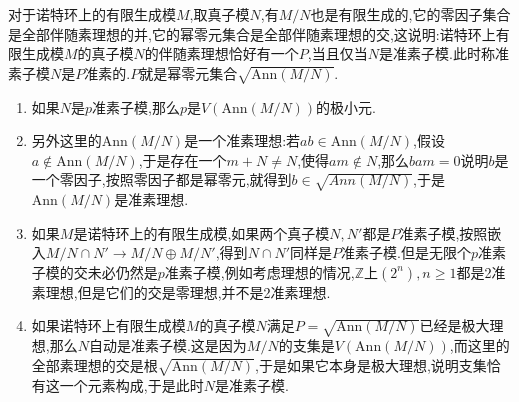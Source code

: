 对于诺特环上的有限生成模$M$,取真子模$N$,有$M/N$也是有限生成的,它的零因子集合是全部伴随素理想的并,它的幂零元集合是全部伴随素理想的交,这说明:诺特环上有限生成模$M$的真子模$N$的伴随素理想恰好有一个$P$,当且仅当$N$是准素子模.此时称准素子模$N$是$P$准素的.$P$就是幂零元集合$\sqrt{\mathrm{Ann}(M/N)}$.
\begin{enumerate}
	\item 如果$N$是$p$准素子模,那么$p$是$V(\mathrm{Ann}(M/N))$的极小元.
	\item 另外这里的$\mathrm{Ann}(M/N)$是一个准素理想:若$ab\in\mathrm{Ann}(M/N)$,假设$a\not\in\mathrm{Ann}(M/N)$,于是存在一个$m+N\not=N$,使得$am\not\in N$,那么$bam=0$说明$b$是一个零因子,按照零因子都是幂零元,就得到$b\in\sqrt{Ann(M/N)}$,于是$\mathrm{Ann}(M/N)$是准素理想.
	\item 如果$M$是诺特环上的有限生成模,如果两个真子模$N,N'$都是$P$准素子模,按照嵌入$M/N\cap N'\to M/N\oplus M/N'$,得到$N\cap N'$同样是$P$准素子模.但是无限个$p$准素子模的交未必仍然是$p$准素子模,例如考虑理想的情况,$\mathbb{Z}$上$(2^n),n\ge1$都是2准素理想,但是它们的交是零理想,并不是2准素理想.
	\item 如果诺特环上有限生成模$M$的真子模$N$满足$P=\sqrt{\mathrm{Ann}(M/N)}$已经是极大理想,那么$N$自动是准素子模.这是因为$M/N$的支集是$V(\mathrm{Ann}(M/N))$,而这里的全部素理想的交是根$\sqrt{\mathrm{Ann}(M/N)}$,于是如果它本身是极大理想,说明支集恰有这一个元素构成,于是此时$N$是准素子模.
\end{enumerate}


